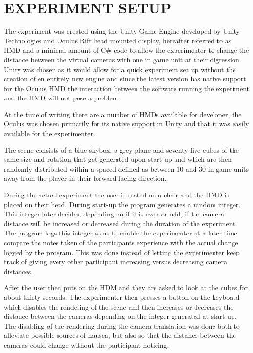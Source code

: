 \documentclass[tog]{acmsiggraph}
\begin{document}
\section{EXPERIMENT SETUP}

The experiment was created using the Unity Game Engine developed by Unity Technologies and Oculus Rift head mounted display, hereafter referred to as HMD and a minimal amount of C\# code to allow the experimenter to change the distance between the virtual cameras with one in game unit at their digression. Unity was chosen as it would allow for a quick experiment set up without the creation of en entirely new engine and since the latest version has native support for the Oculus HMD the interaction between the software running the experiment and the HMD will not pose a problem.

At the time of writing there are a number of HMDs available for developer, the Oculus was chosen primarily for its native support in Unity and that it was easily available for the experimenter.

The scene consists of a blue skybox, a grey plane and seventy five cubes of the same size and rotation that get generated upon start-up and which are then randomly distributed within a spaced defined as between 10 and 30 in game units away from the player in their forward facing direction. 

During the actual experiment the user is seated on a chair and the HMD is placed on their head. During start-up the program generates a random integer. This integer later decides, depending on if it is even or odd, if the camera distance will be increased or decreased during the duration of the experiment. The program logs this integer so as to enable the experimenter at a later time compare the notes taken of the participants experience with the actual change logged by the program. This was done instead of letting the experimenter keep track of giving every other participant increasing versus decreasing camera distances.  

After the user then puts on the HDM and they are asked to look at the cubes for about thirty seconds. The experimenter then presses a button on the keyboard which disables the rendering of the scene and then increases or decreases the distance between the cameras depending on the integer generated at start-up. The disabling of the rendering during the camera translation was done both to alleviate possible sources of nausea, but also so that the distance between the cameras could change without the participant noticing. 
\end{document}
